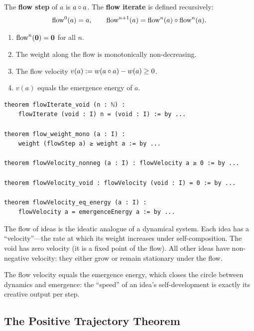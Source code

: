 \begin{definition}
\label{def:flow}
The \textbf{flow step} of $a$ is $a \circ a$.
The \textbf{flow iterate} is defined recursively:
\[
  \text{flow}^0(a) = a, \qquad \text{flow}^{n+1}(a) = \text{flow}^n(a) \circ \text{flow}^n(a).
\]
\end{definition}

\begin{theorem}
\label{thm:flow}
\begin{enumerate}
  \item $\text{flow}^n(\mathbf{0}) = \mathbf{0}$ for all $n$.
  \item The weight along the flow is monotonically non-decreasing.
  \item The flow velocity $v(a) := w(a \circ a) - w(a) \geq 0$.
  \item $v(a)$ equals the emergence energy of $a$.
\end{enumerate}
\end{theorem}

\begin{lstlisting}[caption={Emergence flow (IDT\_v3\_Emergence.lean)}]
theorem flowIterate_void (n : ℕ) :
    flowIterate (void : I) n = (void : I) := by ...

theorem flow_weight_mono (a : I) :
    weight (flowStep a) ≥ weight a := by ...

theorem flowVelocity_nonneg (a : I) : flowVelocity a ≥ 0 := by ...

theorem flowVelocity_void : flowVelocity (void : I) = 0 := by ...

theorem flowVelocity_eq_energy (a : I) :
    flowVelocity a = emergenceEnergy a := by ...
\end{lstlisting}

\begin{interpretation}
The flow of ideas is the ideatic analogue of a dynamical system. Each idea
has a ``velocity''---the rate at which its weight increases under self-composition.
The void has zero velocity (it is a fixed point of the flow). All other ideas
have non-negative velocity: they either grow or remain stationary under the flow.

The flow velocity equals the emergence energy, which closes the circle between
dynamics and emergence: the ``speed'' of an idea's self-development is exactly
its creative output per step.
\end{interpretation}

\subsection{The Positive Trajectory Theorem}


